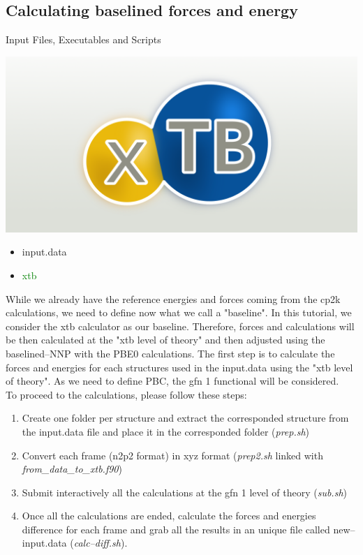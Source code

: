 \documentclass[12pt]{article}
\begin{document}
\subsection{Calculating baselined forces and energy}
\begin{mybox2}{{Input Files, Executables and Scripts}}
\begin{minipage}[c]{0.5\linewidth}
\includegraphics[scale=0.15]{xtb.png}
\end{minipage}
\begin{minipage}[c]{0.5\linewidth}
\begin{itemize}
    \item input.data
    \item \textcolor{green}{xtb}
\end{itemize}
\end{minipage}
\end{mybox2}
While we already have the reference energies and forces coming from the cp2k calculations, we need to define now what we call a "baseline". In this tutorial, we consider the xtb calculator as our baseline. Therefore, forces and calculations will be then calculated at the "xtb level of theory" and then adjusted using the baselined--NNP with the PBE0 calculations. The first step is to calculate the forces and energies for each structures used in the input.data using the "xtb level of theory". As we need to define PBC, the gfn 1 functional will be considered. \\
To proceed to the calculations, please follow these steps:
\begin{enumerate}
    \item Create one folder per structure and extract the corresponded structure from the input.data file and place it in the corresponded folder (\textit{prep.sh})
    \item Convert each frame (n2p2 format) in xyz format (\textit{prep2.sh} linked with \textit{from\_data\_to\_xtb.f90})
    \item Submit interactively all the calculations at the gfn 1 level of theory (\textit{sub.sh})
    \item Once all the calculations are ended, calculate the forces and energies difference for each frame and grab all the results in an unique file called new--input.data (\textit{calc--diff.sh}).
\end{enumerate}
\end{document}
